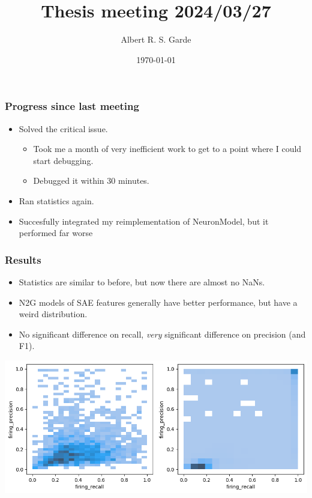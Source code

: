 \documentclass[aspectratio=169]{beamer}
\title{Thesis meeting 2024/03/27}
\author{Albert R. S. Garde}
\date{\today}
\begin{document}
\frame{
	\maketitle
}

\begin{frame}[fragile=singleslide]
	\frametitle{Progress since last meeting}
    \begin{itemize}
        \item Solved the critical issue.
        \begin{itemize}
            \item Took me a month of very inefficient work to get to a point where I could start debugging.
            \item Debugged it within 30 minutes.
        \end{itemize}
        \item Ran statistics again.
        \item Succesfully integrated my reimplementation of NeuronModel, but it performed far worse
    \end{itemize}
\end{frame}
\begin{frame}[fragile=singleslide]
    \frametitle{Results}
    \begin{itemize}
        \item Statistics are similar to before, but now there are almost no NaNs.
        \item N2G models of SAE features generally have better performance, but have a weird distribution.
        \item No significant difference on recall, \emph{very} significant difference on precision (and F1).
    \end{itemize}
    \begin{center}
        \includegraphics[width=\linewidth]{images/heatmap.png}
    \end{center}
\end{frame}
\end{document}
